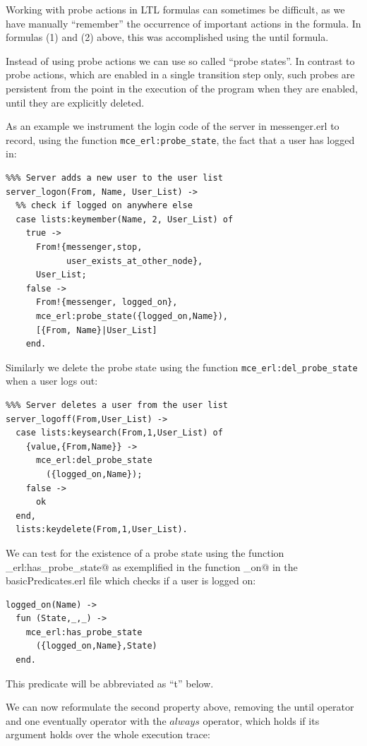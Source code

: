 \documentclass[a4paper]{article}
\begin{document}
Working with probe actions in LTL formulas can sometimes be difficult,
as we have manually ``remember'' the occurrence of
important actions in the formula. 
In formulas (1) and (2) above, this was accomplished using the 
until formula.

Instead of using probe actions we can use so called ``probe states''.
In contrast to probe actions, which are enabled in a single
transition step only, such probes are persistent from the point in 
the execution of the program when they are enabled, until they 
are explicitly deleted.

As an example we instrument the login code of the server in
messenger.erl to record, using the function
\lstinline{mce_erl:probe_state}, the fact that a user has logged in:
\begin{lstlisting}
%%% Server adds a new user to the user list
server_logon(From, Name, User_List) ->
  %% check if logged on anywhere else
  case lists:keymember(Name, 2, User_List) of
    true ->
      From!{messenger,stop,
            user_exists_at_other_node},
      User_List;
    false ->
      From!{messenger, logged_on},
      mce_erl:probe_state({logged_on,Name}),
      [{From, Name}|User_List]
    end.
\end{lstlisting}

Similarly we delete the probe state using the function
\lstinline{mce_erl:del_probe_state} when a user logs out:
\begin{lstlisting}
%%% Server deletes a user from the user list
server_logoff(From,User_List) ->
  case lists:keysearch(From,1,User_List) of
    {value,{From,Name}} -> 
      mce_erl:del_probe_state
        ({logged_on,Name});
    false -> 
      ok
  end,
  lists:keydelete(From,1,User_List).
\end{lstlisting}

We can test for the existence of a probe state using the function
\lstinline@mce_erl:has_probe_state@ as exemplified in the function
\lstinline@logged_on@ in the basicPredicates.erl file which checks if
a user is logged on:
\begin{lstlisting}
logged_on(Name) ->
  fun (State,_,_) -> 
    mce_erl:has_probe_state
      ({logged_on,Name},State) 
  end.
\end{lstlisting}
This predicate will be abbreviated as ``t'' below.

We can now reformulate the second property above, removing
the until operator and one eventually operator with the
$\mathit{always}$ operator, which holds if its argument holds over
the whole execution trace:
\end{document}
